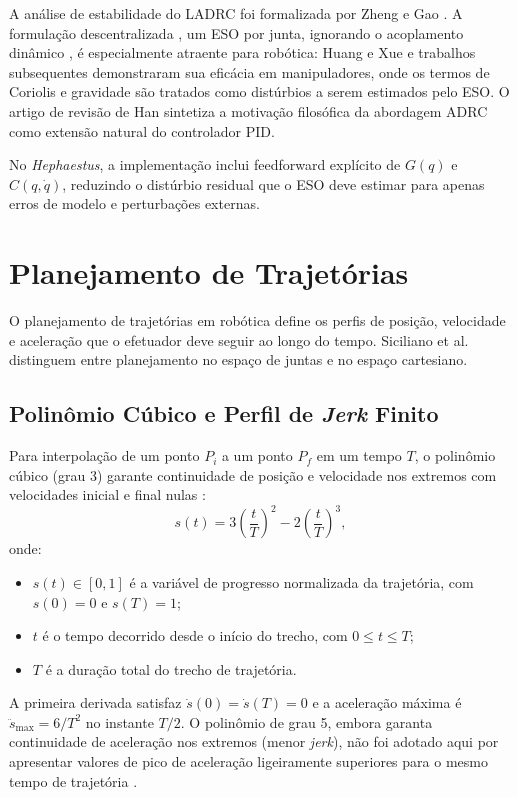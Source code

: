 A análise de estabilidade do LADRC foi formalizada por Zheng e Gao \cite{zheng2010practical}. A formulação descentralizada , um ESO por junta, ignorando o acoplamento dinâmico , é especialmente atraente para robótica: Huang e Xue \cite{huang2014active} e trabalhos subsequentes demonstraram sua eficácia em manipuladores, onde os termos de Coriolis e gravidade são tratados como distúrbios a serem estimados pelo ESO. O artigo de revisão de Han \cite{han2009pid} sintetiza a motivação filosófica da abordagem ADRC como extensão natural do controlador PID.

No \textit{Hephaestus}, a implementação inclui feedforward explícito de $G(q)$ e $C(q,\dot{q})$, reduzindo o distúrbio residual que o ESO deve estimar para apenas erros de modelo e perturbações externas.

\section{Planejamento de Trajetórias}

O planejamento de trajetórias em robótica define os perfis de posição, velocidade e aceleração que o efetuador deve seguir ao longo do tempo. Siciliano et al. \cite{siciliano2009robotics} distinguem entre planejamento no espaço de juntas e no espaço cartesiano.

\subsection{Polinômio Cúbico e Perfil de \textit{Jerk} Finito}

Para interpolação de um ponto $P_i$ a um ponto $P_f$ em um tempo $T$, o polinômio cúbico (grau 3) garante continuidade de posição e velocidade nos extremos com velocidades inicial e final nulas \cite{siciliano2009robotics, craig1989introduction}:
\begin{equation}
    s(t) = 3\left(\frac{t}{T}\right)^2 - 2\left(\frac{t}{T}\right)^3,
    \label{eq:cubic_poly}
\end{equation}
onde:
\begin{itemize}
    \item $s(t) \in [0,1]$ é a variável de progresso normalizada da trajetória, com $s(0)=0$ e $s(T)=1$;
    \item $t$ é o tempo decorrido desde o início do trecho, com $0 \le t \le T$;
    \item $T$ é a duração total do trecho de trajetória.
\end{itemize}
A primeira derivada satisfaz $\dot{s}(0) = \dot{s}(T) = 0$ e a aceleração máxima é $\ddot{s}_{\max} = 6/T^2$ no instante $T/2$. O polinômio de grau 5, embora garanta continuidade de aceleração nos extremos (menor \textit{jerk}), não foi adotado aqui por apresentar valores de pico de aceleração ligeiramente superiores para o mesmo tempo de trajetória \cite{siciliano2009robotics}.

